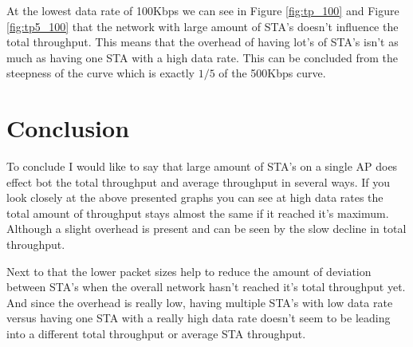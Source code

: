 \documentclass[]{article}
\begin{document}
At the lowest data rate of 100Kbps we can see in Figure \ref{fig:tp_100} and Figure \ref{fig:tp5_100} that the network with large amount of STA's doesn't influence the total throughput.
This means that the overhead of having lot's of STA's isn't as much as having one STA with a high data rate.
This can be concluded from the steepness of the curve which is exactly $1/5$ of the 500Kbps curve.

\section{Conclusion}
To conclude I would like to say that large amount of STA's on a single AP does effect bot the total throughput and average throughput in several ways.
If you look closely at the above presented graphs you can see at high data rates the total amount of throughput stays almost the same if it reached it's maximum.
Although a slight overhead is present and can be seen by the slow decline in total throughput.

Next to that the lower packet sizes help to reduce the amount of deviation between STA's when the overall network hasn't reached it's total throughput yet.
And since the overhead is really low, having multiple STA's with low data rate versus having one STA with a really high data rate doesn't seem to be leading into a different total throughput or average STA throughput.
\end{document}

